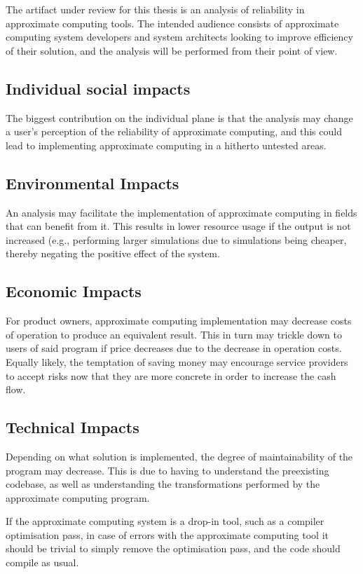 The artifact under review for this thesis is an analysis of reliability in approximate computing tools. The intended audience consists of approximate computing system developers and system architects looking to improve efficiency of their solution, and the analysis will be performed from their point of view. 

\subsection{Individual social impacts}
The biggest contribution on the individual plane is that the analysis may change a user's perception of the reliability of approximate computing, and this could lead to implementing approximate computing in a hitherto untested areas. 


\subsection{Environmental Impacts}
An analysis may facilitate the implementation of approximate computing in fields that can benefit from it. This results in lower resource usage if the output is not increased (e.g., performing larger simulations due to simulations being cheaper, thereby negating the positive effect of the system.

\subsection{Economic Impacts}
For product owners, approximate computing implementation may decrease costs of operation to produce an equivalent result. This in turn may trickle down to users of said program if price decreases due to the decrease in operation costs. 
Equally likely, the temptation of saving money may encourage service providers to accept risks now that they are more concrete in order to increase the cash flow.

\subsection{Technical Impacts}
Depending on what solution is implemented, the degree of maintainability of the program may decrease. This is due to having to understand the preexisting codebase, as well as understanding the transformations performed by the approximate computing program. 

If the approximate computing system is a drop-in tool, such as a compiler optimisation pass, in case of errors with the approximate computing tool it should be trivial to simply remove the optimisation pass, and the code should compile as usual.

